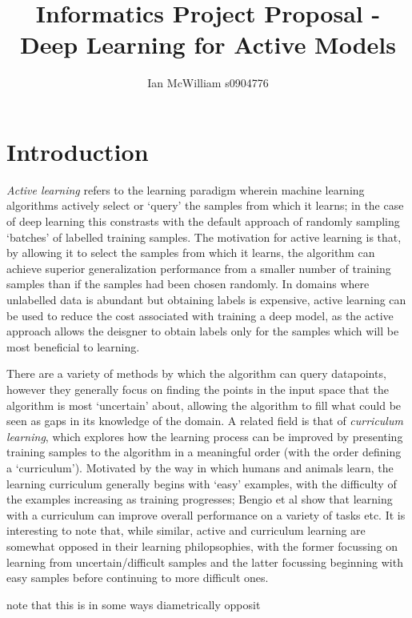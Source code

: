 \documentclass[a4paper,11pt]{article}
\begin{document}
\title{Informatics Project Proposal - Deep Learning for Active Models}
\author{Ian McWilliam s0904776}
\date{}
\maketitle

\section{Introduction}
\textit{Active learning} refers to the learning paradigm wherein machine learning algorithms actively select or `query' the samples from which it learns; in the case of deep learning this constrasts with the default approach of randomly sampling `batches' of labelled training samples. The motivation for active learning is that, by allowing it to select the samples from which it learns, the algorithm can achieve superior generalization performance from a smaller number of training samples than if the samples had been chosen randomly. In domains where unlabelled data is abundant but obtaining labels is expensive, active learning can be used to reduce the cost associated with training a deep model, as the active approach allows the deisgner to obtain labels only for the samples which will be most beneficial to learning. 

There are a variety of methods by which the algorithm can query datapoints, however they generally focus on finding the points in the input space that the algorithm is most `uncertain' about, allowing the algorithm to fill what could be seen as gaps in its knowledge of the domain. A related field is that of \textit{curriculum learning}, which explores how the learning process can be improved by presenting training samples to the algorithm in a meaningful order (with the order defining a `curriculum'). Motivated by the way in which humans and animals learn, the learning curriculum generally begins with `easy' examples, with the difficulty of the examples increasing as training progresses; Bengio et al show that learning with a curriculum can improve overall performance on a variety of tasks etc. It is interesting to note that, while similar, active and curriculum learning are somewhat opposed in their learning philopsophies, with the former focussing on learning from uncertain/difficult samples and the latter focussing beginning with easy samples before continuing to more difficult ones. 

 note that this is in some ways diametrically opposit
\end{document}
